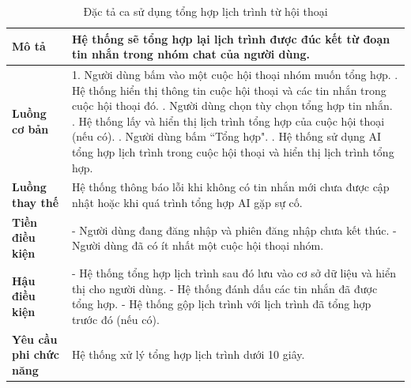 \begin{longtable}{| p{4cm} | p{\dimexpr\linewidth-4cm-4\tabcolsep} |} %
    \caption{Đặc tả ca sử dụng tổng hợp lịch trình từ hội thoại} %
    \label{tab:uc_summarize_itinerary_spec} \\ %

    \hline
    \textbf{Mô tả} & Hệ thống sẽ tổng hợp lại lịch trình được đúc kết từ đoạn tin nhắn trong nhóm chat của người dùng. \\
    \hline
    \endfirsthead %



    \hline %
    \endlastfoot

    \textbf{Luồng cơ bản} & 1. Người dùng bấm vào một cuộc hội thoại nhóm muốn tổng hợp. \newline
                           2. Hệ thống hiển thị thông tin cuộc hội thoại và các tin nhắn trong cuộc hội thoại đó. \newline
                           3. Người dùng chọn tùy chọn tổng hợp tin nhắn. \newline
                           4. Hệ thống lấy và hiển thị lịch trình tổng hợp của cuộc hội thoại (nếu có). \newline
                           5. Người dùng bấm ``Tổng hợp". \newline
                           6. Hệ thống sử dụng AI tổng hợp lịch trình trong cuộc hội thoại và hiển thị lịch trình tổng hợp. \\
    \hline
    \textbf{Luồng thay thế} & Hệ thống thông báo lỗi khi không có tin nhắn mới chưa được cập nhật hoặc khi quá trình tổng hợp AI gặp sự cố. \\
    \hline
    \textbf{Tiền điều kiện} & - Người dùng đang đăng nhập và phiên đăng nhập chưa kết thúc. \newline
                           - Người dùng đã có ít nhất một cuộc hội thoại nhóm. \\
    \hline
    \textbf{Hậu điều kiện} & - Hệ thống tổng hợp lịch trình sau đó lưu vào cơ sở dữ liệu và hiển thị cho người dùng. \newline
                           - Hệ thống đánh dấu các tin nhắn đã được tổng hợp. \newline
                           - Hệ thống gộp lịch trình với lịch trình đã tổng hợp trước đó (nếu có). \\
    \hline
    \textbf{Yêu cầu phi chức năng} & Hệ thống xử lý tổng hợp lịch trình dưới 10 giây. \\

\end{longtable}

